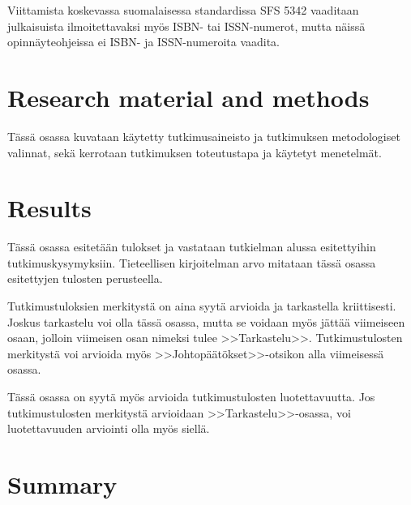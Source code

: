 \documentclass[english,12pt,a4paper,pdftex,sci,utf8]{aaltothesis}
\begin{document}
Viittamista koskevassa suomalaisessa standardissa
SFS 5342 \cite{sfs} vaaditaan julkaisuista ilmoitettavaksi my\"os ISBN- tai
ISSN-numerot, mutta n\"aiss\"a opinn\"ayteohjeissa ei ISBN- ja
ISSN-numeroita vaadita.

\clearpage

\section{Research material and methods}

T\"ass\"a osassa kuvataan k\"aytetty tutkimusaineisto ja
tutkimuksen metodologiset valinnat, sek\"a
kerrotaan tutkimuksen toteutustapa ja k\"aytetyt menetelm\"at.

\clearpage

\section{Results}

T\"ass\"a osassa esitet\"a\"an tulokset ja vastataan tutkielman alussa
esitettyihin tutkimuskysymyksiin. Tieteellisen kirjoitelman
arvo mitataan t\"ass\"a osassa esitettyjen tulosten perusteella.

Tutkimustuloksien merkityst\"a on aina syyt\"a arvioida ja tarkastella
kriittisesti.  Joskus tarkastelu voi olla t\"ass\"a osassa, mutta se
voidaan my\"os j\"att\"a\"a viimeiseen osaan, jolloin viimeisen osan nimeksi
tulee >>Tarkastelu>>. Tutkimustulosten merkityst\"a voi arvioida my\"os
>>Johtop\"a\"at\"okset>>-otsikon alla viimeisess\"a osassa.

T\"ass\"a osassa on syyt\"a my\"os arvioida tutkimustulosten luotettavuutta.
Jos tutkimustulosten merkityst\"a arvioidaan >>Tarkastelu>>-osassa,
voi luotettavuuden arviointi olla my\"os siell\"a.

\clearpage

\section{Summary}
\end{document}
